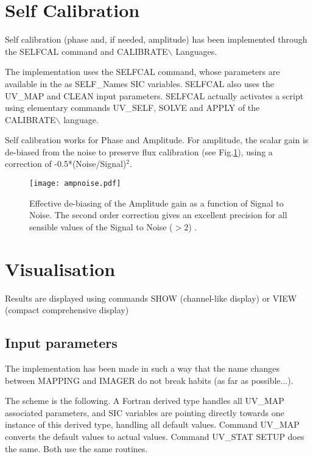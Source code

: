 \documentclass[11pt]{article}
\begin{document}
\section{Self Calibration}

Self calibration (phase and, if needed, amplitude) has been implemented
through the SELFCAL command and CALIBRATE$\backslash$ Languages.

The implementation uses the SELFCAL command, whose parameters
are available in the as SELF\_Names SIC variables. 
SELFCAL also uses the UV\_MAP and CLEAN input parameters. 
SELFCAL actually activates a script using elementary commands UV\_SELF,
SOLVE and APPLY of the CALIBRATE$\backslash$ language.

Self calibration works for Phase and Amplitude. For amplitude, the
scalar gain is de-biased from the noise to preserve flux calibration
(see Fig.\ref{fig:self}), using a correction of -0.5*(Noise/Signal)$^2$.

\begin{figure}[!h]
\centering
    \texttt{[image: ampnoise.pdf]}
    \caption{Effective de-biasing of the Amplitude gain as
    a function of Signal to Noise. The second order correction
    gives an excellent precision for all sensible values
    of the Signal to Noise ($> 2$) .}
    \label{fig:self}
\end{figure}



\section{Visualisation}

Results are displayed using commands SHOW (channel-like display) or VIEW
(compact comprehensive display)

\subsection{Input parameters}

The implementation has been made in such a way that the name changes
between MAPPING and IMAGER do not break habits (as far as possible...).

The scheme is the following. A Fortran derived type handles all UV\_MAP
associated parameters, and SIC variables are pointing directly towards one instance
of this derived type, handling all default values.  Command UV\_MAP converts
the default values to actual values. Command UV\_STAT SETUP does the same. Both
use the same routines.
\end{document}
